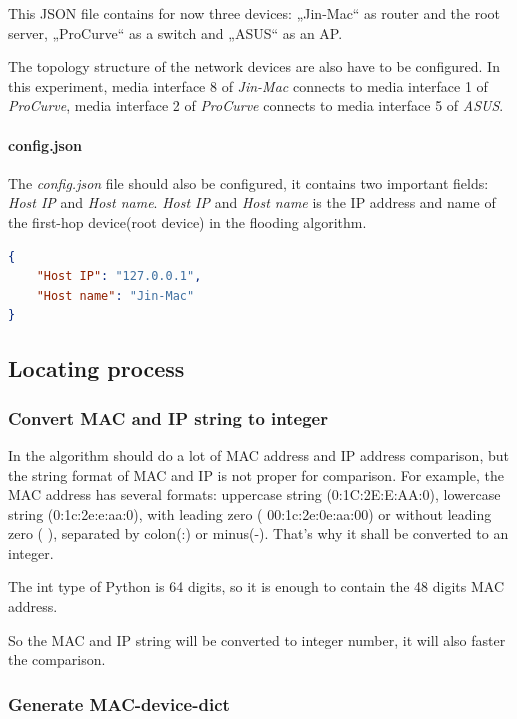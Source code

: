 This JSON file contains for now three devices: „Jin-Mac“ as router and the root server, „ProCurve“ as a switch and „ASUS“ as an AP.

The topology structure of the network devices are also have to be configured.
In this experiment, media interface 8 of \textit{Jin-Mac} connects to media interface 1 of \textit{ProCurve}, media interface 2 of \textit{ProCurve} connects to media interface 5 of \textit{ASUS}.

\paragraph{config.json}

The \textit{config.json} file should also be configured, it contains two important fields: \textit{Host IP} and \textit{Host name}. \textit{Host IP} and \textit{Host name} is the IP address and name of the first-hop device(root device) in the flooding algorithm.

\begin{lstlisting}[language=json,firstnumber=1,caption={Code sample of \textit{config.json}}]
{
	"Host IP": "127.0.0.1",
	"Host name": "Jin-Mac"
}
\end{lstlisting}

\subsection{Locating process}

\subsubsection{Convert MAC and IP string to integer}

In the algorithm should do a lot of MAC address and IP address comparison, but the string format of MAC and IP is not proper for comparison. For example, the MAC address has several formats: uppercase string (0:1C:2E:E:AA:0), lowercase string (0:1c:2e:e:aa:0), with leading zero ( 00:1c:2e:0e:aa:00) or without leading zero ( ), separated by colon(:) or minus(-). That's why it shall be converted to an integer.

The int type of Python is 64 digits, so it is enough to contain the 48 digits MAC address.

So the MAC and IP string will be converted to integer number, it will also faster the comparison.

\subsubsection{Generate MAC-device-dict}

